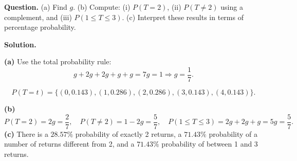 \begin{ExamProblems}
		\textbf{Question.}
		(a) Find $g$.
		(b) Compute: (i) $P(T=2)$, (ii) $P(T\ne 2)$ using a complement, and (iii) $P(1\le T\le 3)$.
		(c) Interpret these results in terms of percentage probability.
		
		\textbf{Solution.}

		\textbf{(a)} Use the total probability rule:
		\[
		g+2g+2g+g+g=7g=1\Rightarrow g=\frac{1}{7}.
		\]

		
\[
		P(T=t)=\{(0,0.143),(1,0.286),(2,0.286),(3,0.143),(4,0.143)\}.
		\]
\begin{center}
		\end{center}
\textbf{(b)}
		\[
		P(T=2)=2g=\frac{2}{7},\quad
		P(T\ne 2)=1-2g=\frac{5}{7},\quad
		P(1\le T\le 3)=2g+2g+g=5g=\frac{5}{7}.
		\]
		\textbf{(c)} There is a $28.57\%$ probability of exactly 2 returns, a $71.43\%$ probability of a number of returns different from 2, and a $71.43\%$ probability of between 1 and 3 returns.
		
	\end{ExamProblems}
	

